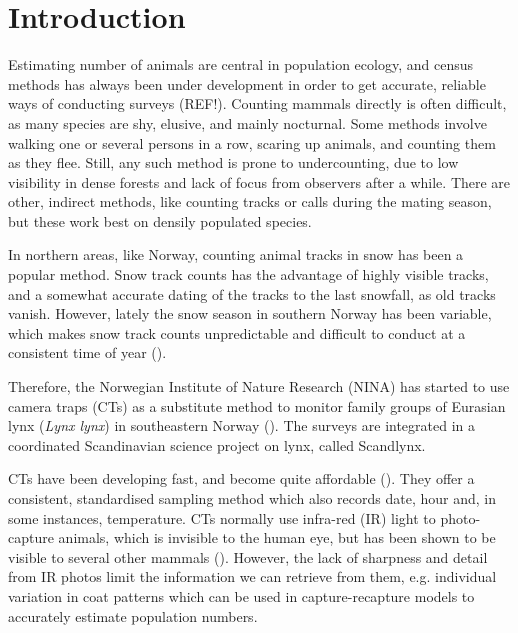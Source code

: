 \chapter{Introduction}
%
Estimating number of animals are central in population ecology, and census methods has always been under development in order to get accurate, reliable ways of conducting surveys (REF!). %
Counting mammals directly is often difficult, as many species are shy, elusive, and mainly nocturnal.
Some methods involve walking one or several persons in a row, scaring up animals, and counting them as they flee.
Still, any such method is prone to undercounting, due to low visibility in dense forests and lack of focus from observers after a while.
There are other, indirect methods, like counting tracks or calls during the mating season, but these work best on densily populated species. %

In northern areas, like Norway, counting animal tracks in snow has been a popular method. %
Snow track counts has the advantage of highly visible tracks, and a somewhat accurate dating of the tracks to the last snowfall, as old tracks vanish.
However, lately the snow season in southern Norway has been variable, which makes snow track counts unpredictable and difficult to conduct at a consistent time of year (\cite{Odden2015}).

Therefore, the Norwegian Institute of Nature Research (NINA) has started to use camera traps %
(CTs) as a substitute method to monitor family groups of Eurasian lynx (\textit{Lynx lynx}) in southeastern Norway  (\cite{Odden2015}). The surveys are integrated in a coordinated Scandinavian science project on lynx, called Scandlynx. %

CTs have been developing fast, and become quite affordable (\cite{Burton2015}).
They offer a consistent, standardised sampling method which also records date, hour and, in some instances, temperature.
CTs normally use infra-red (IR) light to photo-capture animals, which is invisible to the human eye, but has been shown to be visible to several other mammals (\cite{Meek2014}).
However, the lack of sharpness and detail from IR photos limit the information we can retrieve from them, e.g. individual variation in coat patterns which can be used in capture-recapture models to accurately estimate population numbers. 

